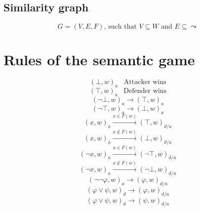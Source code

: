 \documentclass[a4paper,american]{paper}
\begin{document}
\subsection{Similarity graph}
\begin{equation}
	G = (V,E,F)\text{, such that }V \subseteq W\text{ and }E \subseteq \leadsto
\end{equation}

\section*{Rules of the semantic game}

\begin{figure}[H]
	\centering
	\begin{equation}
		(\bot ,w)_{a}\hspace{10pt}\text{Attacker wins}
	\end{equation}
	\begin{equation}
		(\top ,w)_{a}\hspace{10pt}\text{Defender wins}
	\end{equation}
	\begin{equation}
		(\neg\bot ,w)_{a} \rightarrow (\top ,w)_{a}
	\end{equation}
	\begin{equation}
		(\neg\top ,w)_{a} \rightarrow (\bot ,w)_{a}
	\end{equation}
	\begin{equation}
		(x,w)_{a}\xrightarrow{x\in F(w)}(\top ,w)_{d/a}
	\end{equation}
	\begin{equation}
		(x,w)_{a}\xrightarrow{x\not\in F(w)}(\bot ,w)_{d/a}
	\end{equation}
	\begin{equation}
		(\neg x,w)_{a}\xrightarrow{x\in F(w)}(\neg\top ,w)_{d/a}
	\end{equation}
	\begin{equation}
		(\neg x,w)_{a}\xrightarrow{x\not\in F(w)}(\neg\bot ,w)_{d/a}
	\end{equation}
	\begin{equation}
		(\neg\neg\varphi ,w)_{a}\rightarrow (\varphi ,w)_{d/a}
	\end{equation}
	\begin{equation}
		(\varphi\vee\psi ,w)_d\rightarrow (\varphi ,w)_{d/a}
	\end{equation}
	\begin{equation}
		(\varphi\vee\psi ,w)_d\rightarrow (\psi ,w)_{d/a}
	\end{equation}

\end{figure}
\end{document}
